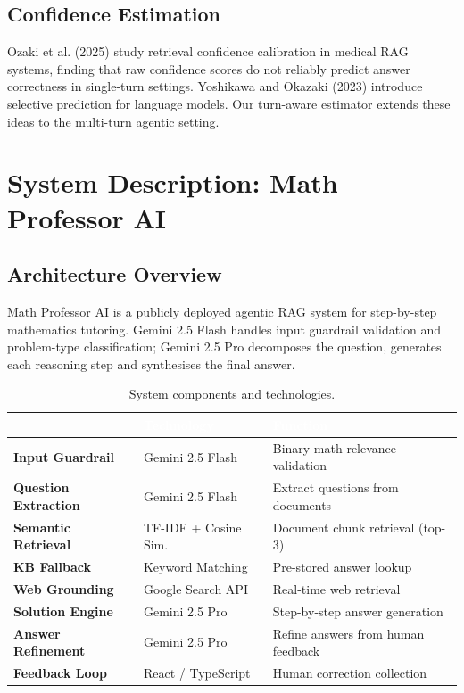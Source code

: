 \documentclass[11pt,a4paper]{article}
\begin{document}
\subsection{Confidence Estimation}
Ozaki et al. (2025) study retrieval confidence calibration in medical RAG systems, finding that raw
confidence scores do not reliably predict answer correctness in single-turn settings. Yoshikawa and Okazaki
(2023) introduce selective prediction for language models. Our turn-aware estimator extends these ideas to
the multi-turn agentic setting.

\section{System Description: Math Professor AI}

\subsection{Architecture Overview}
Math Professor AI is a publicly deployed agentic RAG system for step-by-step mathematics tutoring. Gemini 2.5
Flash handles input guardrail validation and problem-type classification; Gemini 2.5 Pro decomposes the
question, generates each reasoning step and synthesises the final answer.

\begin{table}[H]
\centering
\renewcommand{\arraystretch}{1.35}
\begin{tabular}{>{\bfseries}p{3.6cm} p{3.8cm} p{5.8cm}}
\toprule
\rowcolor{headerblue}
\multicolumn{1}{l}{\textcolor{white}{\textbf{Component}}} &
\textcolor{white}{\textbf{Technology}} &
\textcolor{white}{\textbf{Function}} \\
\midrule
\rowcolor{rowgray} Input Guardrail     & Gemini 2.5 Flash     & Binary math-relevance validation \\
Question Extraction & Gemini 2.5 Flash     & Extract questions from documents \\
\rowcolor{rowgray} Semantic Retrieval  & TF-IDF + Cosine Sim. & Document chunk retrieval (top-3) \\
KB Fallback         & Keyword Matching     & Pre-stored answer lookup \\
\rowcolor{rowgray} Web Grounding       & Google Search API    & Real-time web retrieval \\
Solution Engine     & Gemini 2.5 Pro       & Step-by-step answer generation \\
\rowcolor{rowgray} Answer Refinement   & Gemini 2.5 Pro       & Refine answers from human feedback \\
Feedback Loop       & React / TypeScript   & Human correction collection \\
\bottomrule
\end{tabular}
\caption{System components and technologies.}
\end{table}
\end{document}
